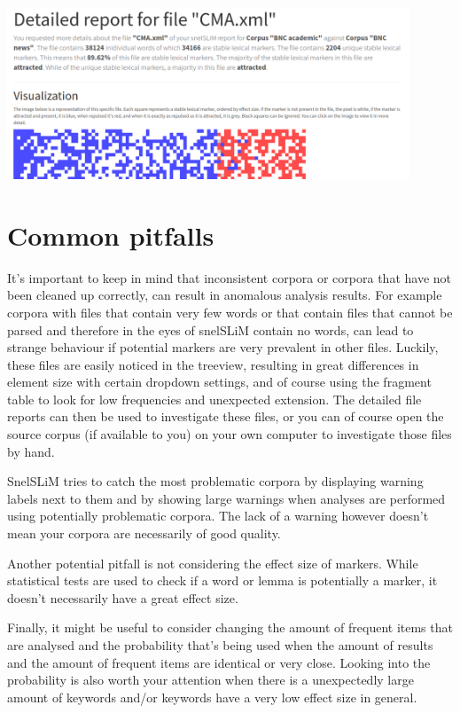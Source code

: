 \documentclass[11pt,a4paper]{article}
\begin{document}
\centerline{\includegraphics[width=0.9\textwidth]{images/filereport.png}}

\section{Common pitfalls}

It's important to keep in mind that inconsistent corpora or corpora that have not been cleaned up correctly, can result in anomalous analysis results. For example corpora with files that contain very few words or that contain files that cannot be parsed and therefore in the eyes of snelSLiM contain no words, can lead to strange behaviour if potential markers are very prevalent in other files. Luckily, these files are easily noticed in the treeview, resulting in great differences in element size with certain dropdown settings, and of course using the fragment table to look for low frequencies and unexpected extension. The detailed file reports can then be used to investigate these files, or you can of course open the source corpus (if available to you) on your own computer to investigate those files by hand.

SnelSLiM tries to catch the most problematic corpora by displaying warning labels next to them and by showing large warnings when analyses are performed using potentially problematic corpora. The lack of a warning however doesn't mean your corpora are necessarily of good quality.

Another potential pitfall is not considering the effect size of markers. While statistical tests are used to check if a word or lemma is potentially a marker, it doesn't necessarily have a great effect size.

Finally, it might be useful to consider changing the amount of frequent items that are analysed and the probability that's being used when the amount of results and the amount of frequent items are identical or very close. Looking into the probability is also worth your attention when there is a unexpectedly large amount of keywords and/or keywords have a very low effect size in general.
\end{document}
